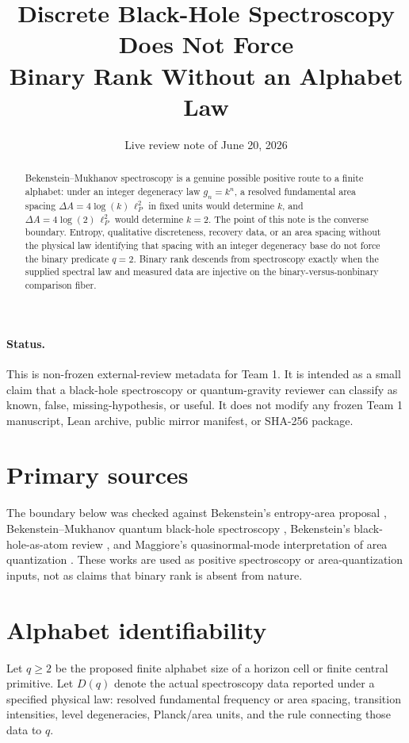 \documentclass[12pt]{article}
\title{Discrete Black-Hole Spectroscopy Does Not Force\\
Binary Rank Without an Alphabet Law}
\author{}
\date{Live review note of June 20, 2026}
\theoremstyle{remark}
\begin{document}
\maketitle

\begin{abstract}
Bekenstein--Mukhanov spectroscopy is a genuine possible positive route to a
finite alphabet: under an integer degeneracy law \(g_n=k^n\), a resolved
fundamental area spacing \(\Delta A=4\log(k)\,\ell_P^2\) in fixed units would
determine \(k\), and \(\Delta A=4\log(2)\,\ell_P^2\) would determine \(k=2\).
The point of this note is the converse boundary.  Entropy, qualitative
discreteness, recovery data, or an area spacing without the physical law
identifying that spacing with an integer degeneracy base do not force the
binary predicate \(q=2\).  Binary rank descends from spectroscopy exactly when
the supplied spectral law and measured data are injective on the
binary-versus-nonbinary comparison fiber.
\end{abstract}

\paragraph{Status.}
This is non-frozen external-review metadata for Team 1.  It is intended as a
small claim that a black-hole spectroscopy or quantum-gravity reviewer can
classify as known, false, missing-hypothesis, or useful.  It does not modify
any frozen Team 1 manuscript, Lean archive, public mirror manifest, or SHA-256
package.

\section{Primary sources}

The boundary below was checked against Bekenstein's entropy-area proposal
\cite{BekensteinEntropy}, Bekenstein--Mukhanov quantum black-hole spectroscopy
\cite{BekensteinMukhanov}, Bekenstein's black-hole-as-atom review
\cite{BekensteinAtoms}, and Maggiore's quasinormal-mode interpretation of
area quantization \cite{MaggioreQNM}.  These works are used as positive
spectroscopy or area-quantization inputs, not as claims that binary rank is
absent from nature.

\section{Alphabet identifiability}

Let \(q\ge2\) be the proposed finite alphabet size of a horizon cell or finite
central primitive.  Let \(D(q)\) denote the actual spectroscopy data reported
under a specified physical law: resolved fundamental frequency or area
spacing, transition intensities, level degeneracies, Planck/area units, and
the rule connecting those data to \(q\).
\end{document}
